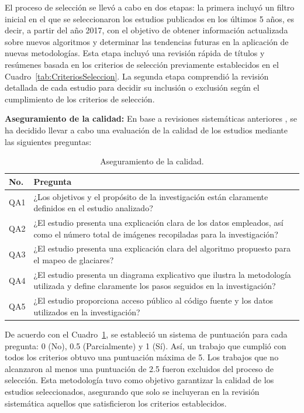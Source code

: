El proceso de selección se llevó a cabo en dos etapas: la primera incluyó un filtro inicial en el que se seleccionaron los estudios publicados en los últimos 5 años, es decir, a partir del año 2017, con el objetivo de obtener información actualizada sobre nuevos algoritmos y determinar las tendencias futuras en la aplicación de nuevas metodologías. Esta etapa incluyó una revisión rápida de títulos y resúmenes basada en los criterios de selección previamente establecidos en el Cuadro~\ref{tab:CriteriosSeleccion}. La segunda etapa comprendió la revisión detallada de cada estudio para decidir su inclusión o exclusión según el cumplimiento de los criterios de selección.

\textbf{Aseguramiento de la calidad:} En base a revisiones sistemáticas anteriores \cite{2019Bajaj}, se ha decidido llevar a cabo una evaluación de la calidad de los estudios mediante las siguientes preguntas:

\begin{table}[H]
\small
\caption{Aseguramiento de la calidad.}
\begin{tabularx}{\textwidth}{lX}
\hline
\textbf{No.} & \textbf{Pregunta}\\
\hline
QA1 & ¿Los objetivos y el propósito de la investigación están claramente definidos en el estudio analizado? \\ \hline
QA2 & ¿El estudio presenta una explicación clara de los datos empleados, así como el número total de imágenes recopiladas para la investigación? \\ \hline
QA3 & ¿El estudio presenta una explicación clara del algoritmo propuesto para el mapeo de glaciares? \\ \hline
QA4 & ¿El estudio presenta un diagrama explicativo que ilustra la metodología utilizada y define claramente los pasos seguidos en la investigación? \\ \hline
QA5 & ¿El estudio proporciona acceso público al código fuente y los datos utilizados en la investigación? \\
\hline
\end{tabularx}
\label{tab:AseguramientoCalidad}
\end{table}

De acuerdo con el Cuadro~\ref{tab:AseguramientoCalidad}, se estableció un sistema de puntuación para cada pregunta: 0 (No), 0.5 (Parcialmente) y 1 (Sí). Así, un trabajo que cumplió con todos los criterios obtuvo una puntuación máxima de 5. Los trabajos que no alcanzaron al menos una puntuación de 2.5 fueron excluidos del proceso de selección. Esta metodología tuvo como objetivo garantizar la calidad de los estudios seleccionados, asegurando que solo se incluyeran en la revisión sistemática aquellos que satisficieron los criterios establecidos.

